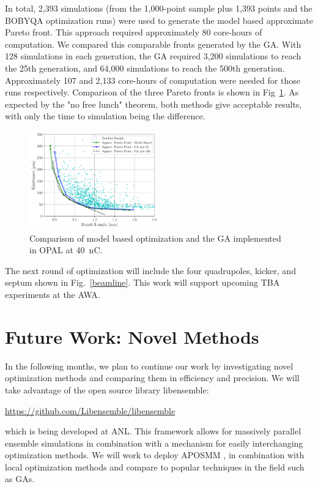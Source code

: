 \documentclass[letterpaper,  %
              ]{jacow-2_3}   %
\begin{document}
In total, 2,393 simulations (from the 1,000-point sample plus 
1,393 points and the BOBYQA optimization runs) were used to
generate the model based approximate Pareto front. 
This approach required approximately 80 core-hours of computation. 
We compared this comparable fronts generated by the GA.
With 128 simulations in each generation, the GA required 3,200
simulations to reach the 25th generation, and 64,000 simulations
to reach the 500th generation. Approximately 107 and 2,133 
core-hours of computation were needed for those runs respectively. 
Comparison of the three Pareto fronts is shown in Fig~\ref{compare}.
As expected by the "no free lunch" theorem, both methods give 
acceptable results, with only the time to simulation being 
the difference. 
\begin{figure}
	\includegraphics[width=0.5\textwidth]{model_vs_ga}
	\caption{Comparison of model based optimization and the GA implemented in OPAL at \SI{40}{nC}. }
	\label{compare}
\end{figure}

The next round of optimization will include the four quadrupoles, 
kicker, and septum shown in Fig.~\ref{beamline}. This work 
will support upcoming TBA experiments at the AWA.

\section{Future Work: Novel Methods}
In the following months, we plan to continue our work 
by investigating novel optimization methods and comparing them 
in efficiency and precision. We will take advantage of the 
open source library libensemble:
\begin{center}
	\url{https://github.com/Libensemble/libensemble}
\end{center} 
which is being developed at ANL.
This framework allows for massively parallel ensemble simulations in 
combination with a mechanism for easily interchanging optimization methods. 
We will work to deploy APOSMM \cite{jeff}, in combination with local optimization
methods and compare to popular techniques in the field such as GAs. 
\end{document}
